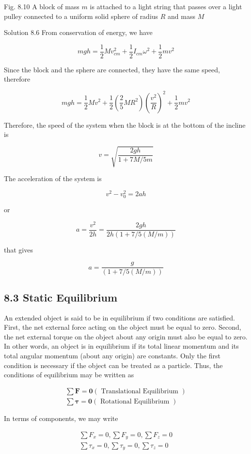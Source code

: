 \documentclass[10pt]{article}
\begin{document}
Fig. 8.10 A block of mass $m$ is attached to a light string that passes over a light pulley connected to a uniform solid sphere of radius $R$ and mass $M$

Solution 8.6 From conservation of energy, we have

$$
m g h=\frac{1}{2} M v_{c m}^{2}+\frac{1}{2} I_{c m} \omega^{2}+\frac{1}{2} m v^{2}
$$

Since the block and the sphere are connected, they have the same speed, therefore

$$
m g h=\frac{1}{2} M v^{2}+\frac{1}{2}\left(\frac{2}{5} M R^{2}\right)\left(\frac{v^{2}}{R}\right)^{2}+\frac{1}{2} m v^{2}
$$

Therefore, the speed of the system when the block is at the bottom of the incline is

$$
v=\sqrt{\frac{2 g h}{1+7 M / 5 m}}
$$

The acceleration of the system is

$$
v^{2}-v_{0}^{2}=2 a h
$$

or

$$
a=\frac{v^{2}}{2 h}=\frac{2 g h}{2 h(1+7 / 5(M / m))}
$$

that gives

$$
a=\frac{g}{(1+7 / 5(M / m))}
$$

\subsection*{8.3 Static Equilibrium}
An extended object is said to be in equilibrium if two conditions are satisfied. First, the net external force acting on the object must be equal to zero. Second, the net external torque on the object about any origin must also be equal to zero. In other words, an object is in equilibrium if its total linear momentum and its total angular momentum (about any origin) are constants. Only the first condition is necessary if the object can be treated as a particle. Thus, the conditions of equilibrium may be written as


\begin{gather*}
\sum \mathbf{F}=\mathbf{0}(\text { Translational Equilibrium })  \tag{8.7}\\
\sum \boldsymbol{\tau}=\mathbf{0}(\text { Rotational Equilibrium }) \tag{8.8}
\end{gather*}


In terms of components, we may write


\begin{gather*}
\sum F_{x}=0, \sum F_{y}=0, \sum F_{z}=0  \tag{8.9}\\
\sum \tau_{x}=0, \sum \tau_{y}=0, \sum \tau_{z}=0 \tag{8.10}
\end{gather*}
\end{document}
